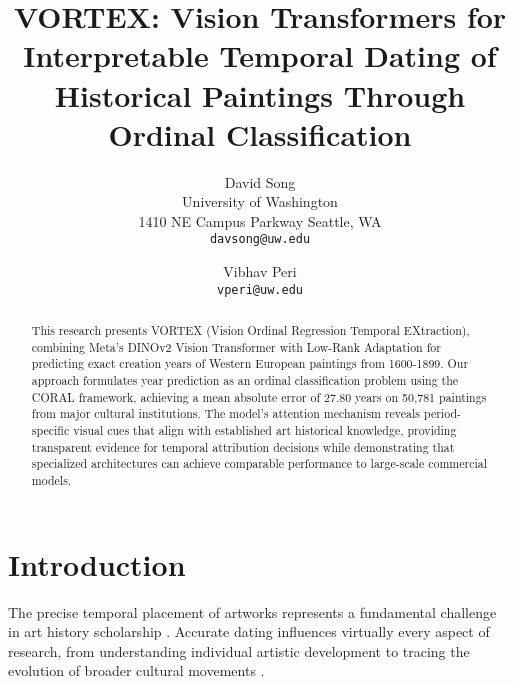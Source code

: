 \documentclass[10pt,twocolumn,letterpaper]{article}
\begin{document}
\title{VORTEX: Vision Transformers for Interpretable Temporal Dating of Historical Paintings Through Ordinal Classification}

\author{David Song\\
University of Washington\\
1410 NE Campus Parkway Seattle, WA\\
{\tt\small davsong@uw.edu}
\and
Vibhav Peri\\
{\tt\small vperi@uw.edu}
}
\maketitle

\begin{abstract}

This research presents VORTEX (Vision Ordinal Regression Temporal EXtraction), combining Meta's DINOv2 Vision Transformer with Low-Rank Adaptation for predicting exact creation years of Western European paintings from 1600-1899. Our approach formulates year prediction as an ordinal classification problem using the CORAL framework, achieving a mean absolute error of 27.80 years on 50,781 paintings from major cultural institutions. The model's attention mechanism reveals period-specific visual cues that align with established art historical knowledge, providing transparent evidence for temporal attribution decisions while demonstrating that specialized architectures can achieve comparable performance to large-scale commercial models.

\end{abstract}

\section{Introduction}

The precise temporal placement of artworks represents a fundamental challenge in art history scholarship \cite{Mishory00}. Accurate dating influences virtually every aspect of research, from understanding individual artistic development to tracing the evolution of broader cultural movements \cite{Elgammal18}. 
\end{document}
